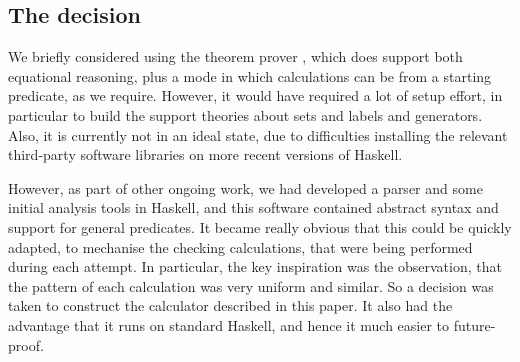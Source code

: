 \subsection{The decision}

We briefly considered using the  theorem prover
\cite{DBLP:conf/utp/Butterfield10,DBLP:conf/utp/Butterfield12},
which does support both equational reasoning,
plus a mode in which calculations can be from a starting predicate,
as we require.
However, it would have required a lot of setup effort,
in particular to build the support theories about sets and labels
and generators.
Also, it is currently not in an ideal state,
due to difficulties installing
the relevant third-party software libraries
on more recent versions of Haskell.

However, as part of other ongoing work,
we had developed a parser and some initial analysis tools
in Haskell\cite{Haskell2010},
and this software contained abstract syntax and support
for general predicates.
It became really obvious that this could be quickly adapted,
to mechanise the checking calculations, that were being performed
during each attempt.
In particular,
the key inspiration was the observation,
that the pattern of each calculation was very uniform and similar.
So a decision was taken to construct the calculator described in this paper.
It also had the advantage that it runs on standard Haskell,
and hence it much easier to future-proof.
